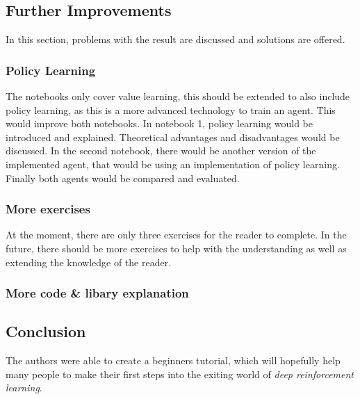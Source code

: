 \documentclass[10pt,a4paper]{article}
\begin{document}
	\subsection{Further Improvements}
	In this section, problems with the result are discussed and solutions are offered.
	
	\subsubsection{Policy Learning}
		The notebooks only cover value learning, this should be extended to also include policy learning, as this is a more advanced technology to train an agent. 
		This would improve both notebooks. 
		In notebook 1, policy learning would be introduced and explained.
		Theoretical advantages and disadvantages would be discussed.
		In the second notebook, there would be another version of the implemented agent, that would be using an implementation of policy learning.
		Finally both agents would be compared and evaluated.
		
	\subsubsection{More exercises}
		At the moment, there are only three exercises for the reader to complete. In the future, there should be more exercises to help with the understanding as well as extending the knowledge of the reader.
		
	\subsubsection{More code \& libary explanation}
		
		
	\subsection{Conclusion}
	
	The authors were able to create a beginners tutorial, which will hopefully help many people to make their first steps into the exiting world of \textit{deep reinforcement learning}.
	 
	
\end{document}
